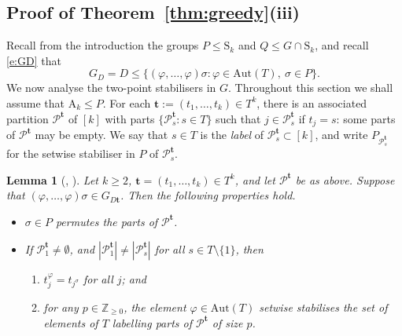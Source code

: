 \documentclass[twoside,a4paper,reqno,11pt]{amsart}
\newcommand{\<}{\langle}
\renewcommand{\>}{\rangle}
\newcommand{\leqs}{\leqslant}
\newcommand{\geqs}{\geqslant}
\def\le{\leqs}
\newcommand{\Aut}{\mathrm{Aut}}
\newcommand{\Sn}{\mathrm{S}}
\newcommand{\An}{\mathrm{A}}
\newtheorem{lem}[thm]{Lemma}
\theoremstyle{definition}
\begin{document}
\subsection{Proof of Theorem~\ref{thm:greedy}(iii)}

Recall from the introduction the groups $P \le \Sn_k$ and $Q \le G \cap \Sn_k$, and recall \eqref{e:GD} that
\begin{equation*}
    G_D = D \leqs \{(\varphi,\dots,\varphi)\sigma:\varphi\in\Aut(T),\ \sigma\in P\}.
\end{equation*}
We now analyse the two-point stabilisers in $G$. Throughout this section we shall assume that $\An_k \le P$. 
For each $\mathbf{t} := (t_1,\dots,t_k)\in T^k$, there is an associated partition $\mathcal{P}^{\mathbf{t}}$ of $[k]$ with parts $\{\mathcal{P}_s^{\mathbf{t}} : s\in T\}$
such that $j\in\mathcal{P}_s^{\mathbf{t}}$ if $t_j = s$: some parts of $\mathcal{P}^{\mathbf{t}}$ may be empty. We say that $s \in T$ is the \emph{label} of $\mathcal{P}^{\mathbf{t}}_s \subset [k]$, and write $P_{\mathcal{P}^{\mathbf{t}}_s}$ for the setwise stabiliser in $P$ of $\mathcal{P}^{\mathbf{t}}_s$. 


\begin{lem}[{\cite[Lemma 3.3]{FHLR_Saxl},  \cite[Lemma 2.2]{H_diag}}]\label{l:H_diag_l:2.2}
	Let $k\geqs 2$, $\mathbf{t} = (t_1,\dots,t_k)\in T^k$, and let $\mathcal{P}^{\mathbf{t}}$ be as above. Suppose that $(\varphi,\dots,\varphi)\sigma\in G_{D\mathbf{t}}$. Then the following properties hold.
	\begin{itemize}\addtolength{\itemsep}{0.2\baselineskip}
		\item[{\rm (i)}] $\sigma\in P$ permutes the parts of $\mathcal{P}^{\mathbf{t}}$. 
        \item[{\rm (ii)}] If $\mathcal{P}_1^{\mathbf{t}} \neq \emptyset$, and $|\mathcal{P}_1^{\mathbf{t}}|\ne |\mathcal{P}_s^{\mathbf{t}}|$ for all $s \in T \setminus \{1\}$, then 
        \begin{enumerate}
            \item[(a)] $t_j^\varphi = t_{j^\sigma}$ for all $j$; and 
		    \item[(b)] for any $p\in \mathbb{Z}_{\geqs 0}$, the element $\varphi \in \Aut(T)$ setwise stabilises the set of elements of $T$ labelling parts of $\mathcal{P}^{\mathbf{t}}$ of size $p$.
	    \end{enumerate}
	\end{itemize}
\end{lem}
\end{document}
